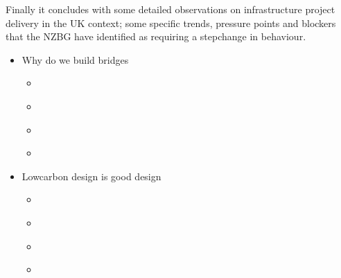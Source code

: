 \documentclass[letterpaper,10pt,english]{jupyterBook}
\begin{document}
\sphinxAtStartPar
Finally it concludes with some detailed observations on infrastructure project delivery in the UK context; some specific trends, pressure points and blockers that the NZBG have identified as requiring a step\sphinxhyphen{}change in behaviour.
\begin{itemize}
\item {} 
\sphinxAtStartPar
Why do we build bridges

\begin{itemize}
\item {} 
\sphinxAtStartPar
{\hyperref[\detokenize{part1/intro_avoid::doc}]{}}

\item {} 
\sphinxAtStartPar
{\hyperref[\detokenize{part1/context::doc}]{}}

\item {} 
\sphinxAtStartPar
{\hyperref[\detokenize{part1/heuristics::doc}]{}}

\item {} 
\sphinxAtStartPar
{\hyperref[\detokenize{part1/keeping_track::doc}]{}}

\end{itemize}
\end{itemize}
\begin{itemize}
\item {} 
\sphinxAtStartPar
Low\sphinxhyphen{}carbon design is good design

\begin{itemize}
\item {} 
\sphinxAtStartPar
{\hyperref[\detokenize{part2/intro_switch::doc}]{}}

\item {} 
\sphinxAtStartPar
{\hyperref[\detokenize{part2/materials::doc}]{}}

\item {} 
\sphinxAtStartPar
{\hyperref[\detokenize{part2/specification::doc}]{}}

\item {} 
\sphinxAtStartPar
{\hyperref[\detokenize{part2/carbon_and_cost::doc}]{}}

\end{itemize}
\end{itemize}
\end{document}
